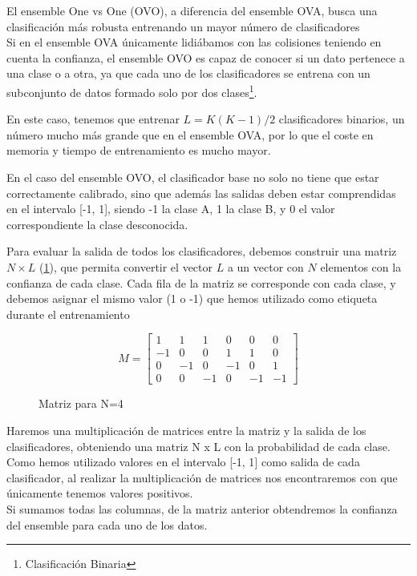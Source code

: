 El ensemble One vs One (OVO), a diferencia del ensemble OVA, busca una
clasificación más robusta entrenando un mayor número de clasificadores\\
Si en el ensemble OVA únicamente lidiábamos con las colisiones teniendo en cuenta
la confianza, el ensemble OVO es capaz de conocer si un dato pertenece a
una clase o a otra, ya que cada uno de los clasificadores se entrena con
un subconjunto de datos formado solo por dos clases\footnote{Clasificación Binaria}.

En este caso, tenemos que entrenar $L = K(K-1)/2$ clasificadores binarios,
un número mucho más grande que en el ensemble OVA, por lo que el coste
en memoria y tiempo de entrenamiento es mucho mayor.

En el caso del ensemble OVO, el clasificador base no solo no tiene que
estar correctamente calibrado, sino que además las salidas deben estar
comprendidas en el intervalo {[}-1, 1{]}, siendo -1 la clase A, 1 la
clase B, y 0 el valor correspondiente la clase desconocida.

Para evaluar la salida de todos los clasificadores, debemos construir
una matriz $N \times L$ (\ref{fig:matrix-ovo}), que permita convertir el vector $L$ a un vector con $N$
elementos con la confianza de cada clase. Cada fila de la matriz se
corresponde con cada clase, y debemos asignar el mismo valor (1 o -1)
que hemos utilizado como etiqueta durante el entrenamiento
\begin{figure}
    \centering
    $$
    M = 
    \begin{bmatrix}
    1 & 1 & 1 & 0 & 0 & 0 \\
    -1 & 0 & 0 &  1 & 1 & 0 \\
    0 & -1 & 0 & -1 & 0 & 1 \\
    0 & 0 & -1 & 0 & -1 & -1 
    
    \end{bmatrix}
    $$
    \label{fig:matrix-ovo}
    \caption{Matriz para N=4}
\end{figure}


Haremos una multiplicación de matrices entre la matriz y la salida de
los clasificadores, obteniendo una matriz N x L con la probabilidad de
cada clase. Como hemos utilizado valores en el intervalo {[}-1, 1{]}
como salida de cada clasificador, al realizar la multiplicación de
matrices nos encontraremos con que únicamente tenemos valores positivos.\\
Si sumamos todas las columnas, de la matriz anterior obtendremos la
confianza del ensemble para cada uno de los datos.


